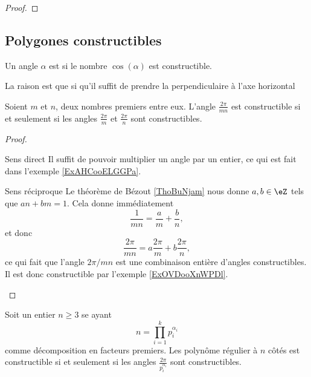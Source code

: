 \begin{proof}
\end{proof}

\subsection{Polygones constructibles}

\begin{definition}
    Un angle \( \alpha\) est  si le nombre \( \cos(\alpha)\) est constructible.
\end{definition}
La raison est que si qu'il suffit de prendre la perpendiculaire à l'axe horizontal

\begin{lemma}   \label{LemMAHooXcOCpr}
    Soient \( m\) et \( n\), deux nombres premiers entre eux. L'angle \( \frac{ 2\pi }{ mn }\) est constructible si et seulement si les angles \( \frac{ 2\pi }{ m }\) et \( \frac{ 2\pi }{ n }\) sont constructibles.
\end{lemma}

\begin{proof}
    \begin{subproof}
        \item[Sens direct]
            Il suffit de pouvoir multiplier un angle par un entier, ce qui est fait dans l'exemple \ref{ExAHCooELGGPa}.
        \item[Sens réciproque]
            Le théorème de Bézout \ref{ThoBuNjam} nous donne \( a,b\in \eZ\) tels que \( an+bm=1\). Cela donne immédiatement
            \begin{equation}
                \frac{1}{ mn }=\frac{ a }{ m }+\frac{ b }{ n },
            \end{equation}
            et donc
            \begin{equation}
                \frac{ 2\pi }{ mn }=a\frac{ 2\pi }{ m }+b\frac{ 2\pi }{ n },
            \end{equation}
            ce qui fait que l'angle \( 2\pi/mn\) est une combinaison entière d'angles constructibles. Il est donc constructible par l'exemple \ref{ExOVDooXnWPDl}.
    \end{subproof}
\end{proof}

\begin{lemma}   \label{LemUKNooSBzDyY}
    Soit un entier \( n\geq 3\) se ayant
    \begin{equation}
        n=\prod_{i=1}^kp_i^{\alpha_i}
    \end{equation}
    comme décomposition en facteurs premiers. Les polynôme régulier à \( n\) côtés est constructible si et seulement si les angles \( \frac{ 2\pi }{ p_i^{\alpha_i} }\) sont constructibles.
\end{lemma}

